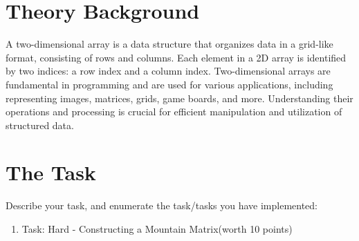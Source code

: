 \documentclass[12pt]{article}
\begin{document}
\setcounter{page}{2}
\pagestyle{fancy}
\fancyhf{}
\rhead{\thepage}

\section*{Theory Background}
\hspace{0.8cm}A two-dimensional array is a data structure that organizes data in a grid-like format, consisting of rows and columns. Each element in a 2D array is identified by two indices: a row index and a column index.
Two-dimensional arrays are fundamental in programming and are used for various applications, including representing images, matrices, grids, game boards, and more. Understanding their operations and processing is crucial for efficient manipulation and utilization of structured data.

\section*{The Task}

Describe your task, and enumerate the task/tasks you have implemented:
\begin{enumerate}
  \item Task: Hard - Constructing a Mountain Matrix(worth 10 points)
\end{enumerate}
\end{document}
